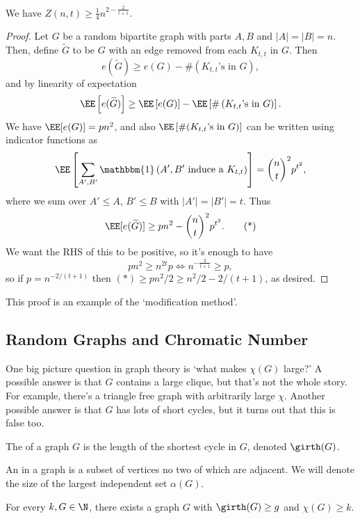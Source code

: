 \documentclass[a4paper]{scrartcl}
\begin{document}
\begin{theorem}
	We have $Z(n, t) \geq \frac{1}{4}n^{2 - \frac{2}{t + 1}}$.
\end{theorem}
\begin{proof}
	Let $G$ be a random bipartite graph with parts $A, B$ and $|A| = |B| = n$.
	Then, define $\widetilde{G}$ to be $G$ with an edge removed from each $K_{t, t}$ in $G$.
	Then
	$$
	e(\widetilde{G}) \geq e(G) - \#\left(K_{t, t}\text{'s in $G$}\right),
	$$
	and by linearity of expectation
	$$
	\EE \left[e(\widetilde{G})\right] \geq \EE\left[e(G)\right] - \EE\left[\#\left(K_{t, t}\text{'s in $G$}\right)\right].
	$$
	We have $\EE[e(G)] = pn^2$, and also $\EE\left[\#(K_{t,t}\text{'s in $G$})\right]$ can be written using indicator functions as 
$$
	\EE\left[\sum_{A', B'} \mathbbm{1}\left(A', B' \text{ induce a $K_{t, t}$}\right)\right] = \binom{n}{t}^2 p^{t^2},
$$
where we sum over $A' \leq A$, $B' \leq B$ with $|A'| = |B'| = t$. Thus
\begin{equation}\label{eq:zar}
	\EE[e(\widetilde{G})] \geq pn^2 - \binom{n}{t}^2p^{t^2}.\tag{*}
\end{equation}
We want the RHS of this to be positive, so it's enough to have
$$
pn^2 \geq n^{2t}p \iff n^{-\frac{2}{t + 1}} \geq p,
$$
so if $p = n^{-2/(t + 1)}$ then $(*) \geq pn^2/2 \geq n^2/2 - 2/(t+1)$, as desired.
\end{proof}

This proof is an example of the `modification method'.

\subsection{Random Graphs and Chromatic Number}


One big picture question in graph theory is `what makes $\chi(G)$ large?'
A possible answer is that $G$ contains a large clique, but that's not the whole story. For example, there's a triangle free graph with arbitrarily large $\chi$. Another possible answer is that $G$ has lots of short cycles, but it turns out that this is false too.

\begin{definition}[Girth]
	The  of a graph $G$ is the length of the shortest cycle in $G$, denoted $\girth(G)$.
\end{definition}

\begin{definition}
	An  in a graph is a subset of vertices no two of which are adjacent. We will denote the size of the largest independent set $\alpha(G)$.
\end{definition}

\begin{theorem}
	For every $k, G \in \N$, there exists a graph $G$ with $\girth(G) \geq g$ and $\chi(G) \geq k$.
\end{theorem}
\end{document}

